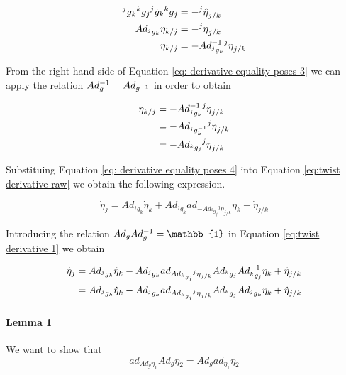 \documentclass[12pt,a4paper]{book}
\begin{document}
\begin{equation}\label{eq: derivative equality poses 3}
\begin{aligned}
	{^jg_k}{^kg_j}{^j\dot{g}_k}{^kg_j} 	&= - {^j \hat{\eta}}_{j/k}\\
	Ad_{^jg_k} \eta_{k/j}					&= - {^j {\eta}}_{j/k} \\
	\eta_{k/j} &= - Ad_{^jg_k} ^{-1} {^j {\eta}}_{j/k}
\end{aligned}
\end{equation}

From the right hand side of Equation \eqref{eq: derivative equality poses 3} we can apply the relation $Ad_g ^{-1} = Ad_{g^{-1}} $ in order to obtain

\begin{equation}\label{eq: derivative equality poses 4}
\begin{aligned}
	\eta_{k/j} 	&= - Ad_{^jg_k} ^{-1} {^j {\eta}}_{j/k} \\
				&= - Ad_{^jg_k^{-1}}  {^j {\eta}}_{j/k} \\
				&= - Ad_{^kg_j}  {^j {\eta}}_{j/k} \\
\end{aligned}
\end{equation}

Substituing Equation \eqref{eq: derivative equality poses 4} into Equation \eqref{eq:twist derivative raw} we obtain the following expression.

\begin{equation}\label{eq:twist derivative 1}
	\dot{\eta}_j = Ad_{^jg_k} \dot{\eta}_k + Ad_{^jg_k} ad_{- Ad_{^kg_j} {^j {\eta}}_{j/k}} \eta_k + \dot{\eta}_{j/k} 
\end{equation}

Introducing the relation $Ad_g Ad_g\inv = \mathbb{1}$ in Equation \eqref{eq:twist derivative 1} we obtain

\begin{equation}\label{eq:twist derivative 2}
\begin{aligned}
	\dot{\eta}_j 	&= Ad_{^jg_k} \dot{\eta}_k - Ad_{^jg_k} ad_{Ad_{^kg_j} {^j {\eta}}_{j/k}} Ad_{^kg_j} Ad_{^kg_j} ^{-1} \eta_k + \dot{\eta}_{j/k} \\ 
					&= Ad_{^jg_k} \dot{\eta}_k - Ad_{^jg_k} ad_{Ad_{^kg_j} {^j {\eta}}_{j/k}} Ad_{^kg_j} Ad_{^jg_k} \eta_k + \dot{\eta}_{j/k} 
\end{aligned}
\end{equation}


\paragraph{Lemma 1}
We want to show that 
\begin{equation}
	ad_{Ad_g \eta_1} Ad_g \eta_2 = Ad_g ad_{\eta_1} \eta_2
\end{equation}
\end{document}
